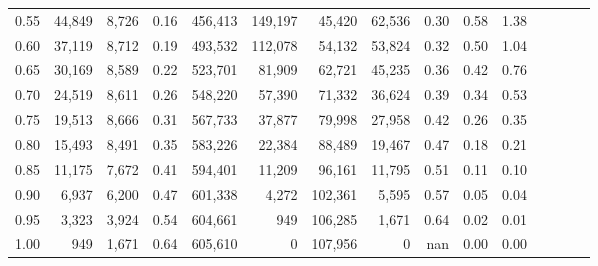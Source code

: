 \begin{tabular}{rrrcrrrrrrrrrrr}
0.55 &  44,849 &  8,726 &                                       0.16 &  456,413 &  149,197 &   45,420 &   62,536 &  0.30 &  0.58 &                         1.38 \\
0.60 &  37,119 &  8,712 &                                       0.19 &  493,532 &  112,078 &   54,132 &   53,824 &  0.32 &  0.50 &                         1.04 \\
0.65 &  30,169 &  8,589 &                                       0.22 &  523,701 &   81,909 &   62,721 &   45,235 &  0.36 &  0.42 &                         0.76 \\
0.70 &  24,519 &  8,611 &                                       0.26 &  548,220 &   57,390 &   71,332 &   36,624 &  0.39 &  0.34 &                         0.53 \\
0.75 &  19,513 &  8,666 &                                       0.31 &  567,733 &   37,877 &   79,998 &   27,958 &  0.42 &  0.26 &                         0.35 \\
0.80 &  15,493 &  8,491 &                                       0.35 &  583,226 &   22,384 &   88,489 &   19,467 &  0.47 &  0.18 &                         0.21 \\
0.85 &  11,175 &  7,672 &                                       0.41 &  594,401 &   11,209 &   96,161 &   11,795 &  0.51 &  0.11 &                         0.10 \\
0.90 &   6,937 &  6,200 &                                       0.47 &  601,338 &    4,272 &  102,361 &    5,595 &  0.57 &  0.05 &                         0.04 \\
0.95 &   3,323 &  3,924 &                                       0.54 &  604,661 &      949 &  106,285 &    1,671 &  0.64 &  0.02 &                         0.01 \\
1.00 &     949 &  1,671 &                                       0.64 &  605,610 &        0 &  107,956 &        0 &   nan &  0.00 &                         0.00 \\
\bottomrule
\end{tabular}
